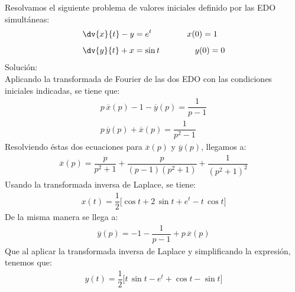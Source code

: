 \begin{ejemplo}
Resolvamos el siguiente problema de valores iniciales definido por las EDO simultáneas:
\begin{align*}
\dv{x}{t} - y &= e^{t} \hspace{1.5cm} x(0) =  1 \\[0.5em]
\dv{y}{t} + x &= \sin t \hspace{1.5cm} y(0) =  0
\end{align*}
Solución:
\\[0.5em]
Aplicando la transformada de Fourier de las dos EDO con las condiciones iniciales indicadas, se tiene que:
\begin{align*}
p \, \overline{x} (p) - 1 - \overline{y} (p) = \dfrac{1}{p -1} \\[0.5em]
p \, \overline{y} (p) + \overline{x} (p) = \dfrac{1}{p^{2} -1}
\end{align*}
Resolviendo éstas dos ecuaciones para $\overline{x}(p)$ y $\overline{y}(p)$, llegamos a:
\begin{align*}
\overline{x}(p) = \dfrac{p}{p^{2} + 1} + \dfrac{p}{(p - 1)(p^{2} + 1)} + \dfrac{1}{(p^{2} + 1)^{2}}
\end{align*}
Usando la transformada inversa de Laplace, se tiene:
\begin{align*}
x(t) = \dfrac{1}{2} \big[ \cos t + 2 \, \sin t +  e^{t} - t \, \cos t \big]
\end{align*}
De la misma manera se llega a:
\begin{align*}
\overline{y} (p) = - 1 - \dfrac{1}{p - 1} + p \, \overline{x} (p)
\end{align*}
Que al aplicar la transformada inversa de Laplace y simplificando la expresión, tenemos que:
\begin{align*}
y(t)= \dfrac{1}{2} \big[ t \, \sin t - e^{t} + \cos t - \sin t \big]
\end{align*}
\end{ejemplo}
